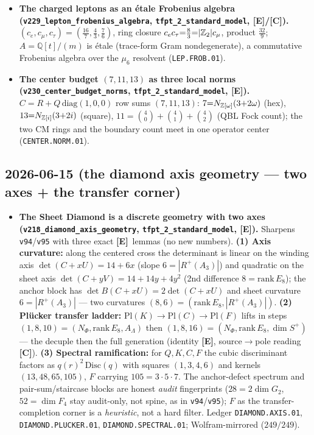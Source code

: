\documentclass[11pt]{article}
\providecommand{\mE}{\textbf{[E]}}\providecommand{\mC}{\textbf{[C]}}
\begin{document}
\begin{itemize}
\item \textbf{The charged leptons as an \'etale Frobenius algebra (\texttt{v229\_lepton\_frobenius\_algebra},
  \texttt{tfpt\_2\_standard\_model}, \mE/\mC).} $(c_e,c_\mu,c_\tau){=}(\tfrac{16}7,\tfrac43,\tfrac76)$,
  ring closure $c_e c_\tau{=}\tfrac83{=}|\mathbb{Z}_2|c_\mu$, product $\tfrac{32}9$; $A{=}\mathbb Q[t]/(m)$ is \'etale
  (trace-form Gram nondegenerate), a commutative Frobenius algebra over the $\mu_6$ resolvent
  (\texttt{LEP.FROB.01}).
\item \textbf{The center budget $(7,11,13)$ as three local norms (\texttt{v230\_center\_budget\_norms},
  \texttt{tfpt\_2\_standard\_model}, \mE).} $C{=}R{+}Q\,\mathrm{diag}(1,0,0)$ row sums $(7,11,13)$:
  $7{=}N_{\mathbb{Z}[\omega]}(3{+}2\omega)$ (hex), $13{=}N_{\mathbb{Z}[i]}(3{+}2i)$ (square), $11{=}\binom40{+}\binom41{+}\binom42$
  (QBL Fock count); the two CM rings and the boundary count meet in one operator center
  (\texttt{CENTER.NORM.01}).
\end{itemize}

\subsection*{2026-06-15 (the diamond axis geometry --- two axes + the transfer corner)}
\begin{itemize}
\item \textbf{The Sheet Diamond is a discrete geometry with two axes
  (\texttt{v218\_diamond\_axis\_geometry}, \texttt{tfpt\_2\_standard\_model}, \mE).} Sharpens
  \texttt{v94}/\texttt{v95} with three exact \mE\ lemmas (no new numbers). \textbf{(1) Axis curvature:}
  along the centered cross the determinant is linear on the winding axis $\det(C{+}xU)=14{+}6x$ (slope
  $6{=}|R^+(A_3)|$) and quadratic on the sheet axis $\det(C{+}yV)=14{+}14y{+}4y^2$ (2nd difference
  $8{=}\mathrm{rank}\,E_8$); the anchor block has $\det B(C{+}xU)=2\det(C{+}xU)$ and sheet curvature
  $6{=}|R^+(A_3)|$ --- two curvatures $(8,6)=(\mathrm{rank}\,E_8,|R^+(A_3)|)$. \textbf{(2) Pl\"ucker
  transfer ladder:} $\mathrm{Pl}(K)\to\mathrm{Pl}(C)\to\mathrm{Pl}(F)$ lifts in steps
  $(1,8,10)=(N_\Phi,\mathrm{rank}\,E_8,A_\Lambda)$ then $(1,8,16)=(N_\Phi,\mathrm{rank}\,E_8,\dim S^+)$ ---
  the decuple then the full generation (identity \mE, source$\to$pole reading \mC). \textbf{(3) Spectral
  ramification:} for $Q,K,C,F$ the cubic discriminant factors as $q(r)^2\,\mathrm{Disc}(q)$ with squares
  $(1,3,4,6)$ and kernels $(13,48,65,105)$, $F$ carrying $105=3{\cdot}5{\cdot}7$. The anchor-defect
  spectrum and pair-sum/staircase blocks are honest \emph{audit} fingerprints ($28{=}2\dim G_2$,
  $52{=}\dim F_4$ stay audit-only, not spine, as in \texttt{v94}/\texttt{v95}); $F$ as the
  transfer-completion corner is a \emph{heuristic}, not a hard filter. Ledger \texttt{DIAMOND.AXIS.01},
  \texttt{DIAMOND.PLUCKER.01}, \texttt{DIAMOND.SPECTRAL.01}; Wolfram-mirrored ($249/249$).
\end{itemize}
\end{document}
